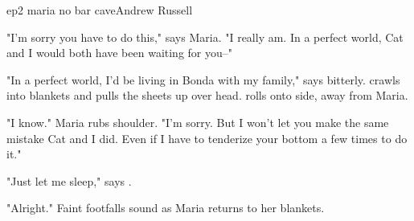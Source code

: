\documentclass{book}
\begin{document}
\begin{childnode}{ep2 maria no bar cave}{Andrew Russell}


    "I'm sorry you have to do this," says Maria. "I really am. In a perfect world, Cat and I would both have been waiting for you--"

    "In a perfect world, I'd be living in Bonda with my family," says \name{} bitterly. \HeShe{} crawls into \hisher{} blankets and pulls the sheets up over \hisher{} head. \HeShe{} rolls onto \hisher{} side, away from Maria.

    "I know." Maria rubs \names{} shoulder. "I'm sorry. But I won't let you make the same mistake Cat and I did. Even if I have to tenderize your bottom a few times to do it."

    "Just let me sleep," says \name{}.

    "Alright." Faint footfalls sound as Maria returns to her blankets.


\end{childnode}
\end{document}

